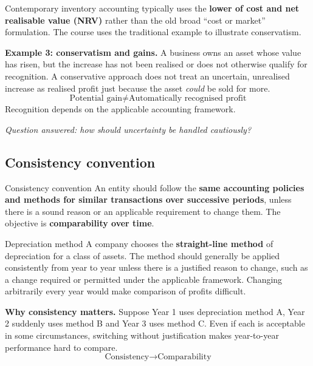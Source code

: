 \documentclass[11pt,a4paper]{article}
\begin{document}
\begin{impbox}
Contemporary inventory accounting typically uses the \textbf{lower of cost and net realisable value (NRV)} rather
than the old broad ``cost or market'' formulation. The course uses the traditional example to illustrate
conservatism.
\end{impbox}

\textbf{Example 3: conservatism and gains.} A business owns an asset whose value has risen, but the increase has not
been realised or does not otherwise qualify for recognition. A conservative approach does not treat an uncertain,
unrealised increase as realised profit just because the asset \emph{could} be sold for more.
\[
\boxed{\text{Potential gain}\neq\text{Automatically recognised profit}}
\]
Recognition depends on the applicable accounting framework.

\begin{keybox}
\emph{Question answered: how should uncertainty be handled cautiously?}
\end{keybox}

\subsection{Consistency convention}

\begin{defbox}{Consistency convention}
An entity should follow the \textbf{same accounting policies and methods for similar transactions over successive
periods}, unless there is a sound reason or an applicable requirement to change them. The objective is
\textbf{comparability over time}.
\end{defbox}

\begin{exbox}{Depreciation method}
A company chooses the \textbf{straight-line method} of depreciation for a class of assets. The method should
generally be applied consistently from year to year unless there is a justified reason to change, such as a change
required or permitted under the applicable framework. Changing arbitrarily every year would make comparison of
profits difficult.
\end{exbox}

\textbf{Why consistency matters.} Suppose Year 1 uses depreciation method A, Year 2 suddenly uses method B and Year 3
uses method C. Even if each is acceptable in some circumstances, switching without justification makes year-to-year
performance hard to compare.
\[
\boxed{\text{Consistency}\rightarrow\text{Comparability}}
\]
\end{document}
